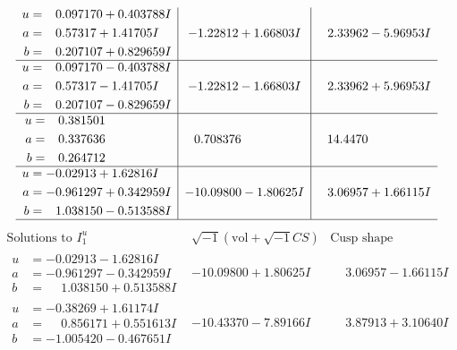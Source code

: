 \documentclass[1p]{elsarticle_modified}
\theoremstyle{definition}
\newcommand{\I}{\sqrt{-1}}
\begin{document}
$$\begin{array}{c|c|c}
\begin{aligned}
u &= \phantom{-}0.097170 + 0.403788 I \\
a &= \phantom{-}0.57317 + 1.41705 I \\
b &= \phantom{-}0.207107 + 0.829659 I\end{aligned}
 & -1.22812 + 1.66803 I & \phantom{-}2.33962 - 5.96953 I \\ \hline\begin{aligned}
u &= \phantom{-}0.097170 - 0.403788 I \\
a &= \phantom{-}0.57317 - 1.41705 I \\
b &= \phantom{-}0.207107 - 0.829659 I\end{aligned}
 & -1.22812 - 1.66803 I & \phantom{-}2.33962 + 5.96953 I \\ \hline\begin{aligned}
u &= \phantom{-}0.381501\phantom{ +0.000000I} \\
a &= \phantom{-}0.337636\phantom{ +0.000000I} \\
b &= \phantom{-}0.264712\phantom{ +0.000000I}\end{aligned}
 & \phantom{-}0.708376\phantom{ +0.000000I} & \phantom{-}14.4470\phantom{ +0.000000I} \\ \hline\begin{aligned}
u &= -0.02913 + 1.62816 I \\
a &= -0.961297 + 0.342959 I \\
b &= \phantom{-}1.038150 - 0.513588 I\end{aligned}
 & -10.09800 - 1.80625 I & \phantom{-}3.06957 + 1.66115 I\\
 \hline 
 \end{array}$$\newpage$$\begin{array}{c|c|c}  
\text{Solutions to }I^u_{1}& \I (\text{vol} + \sqrt{-1}CS) & \text{Cusp shape}\\
 \hline 
\begin{aligned}
u &= -0.02913 - 1.62816 I \\
a &= -0.961297 - 0.342959 I \\
b &= \phantom{-}1.038150 + 0.513588 I\end{aligned}
 & -10.09800 + 1.80625 I & \phantom{-}3.06957 - 1.66115 I \\ \hline\begin{aligned}
u &= -0.38269 + 1.61174 I \\
a &= \phantom{-}0.856171 + 0.551613 I \\
b &= -1.005420 - 0.467651 I\end{aligned}
 & -10.43370 - 7.89166 I & \phantom{-}3.87913 + 3.10640 I \\ \hline\begin{aligned}

\end{aligned}
\end{array}$$
\end{document}
